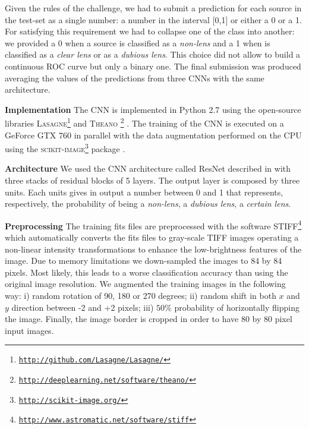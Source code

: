 \documentclass[useAMS,usenatbib]{mnras}
\begin{document}
Given the rules of the challenge, we had to submit a prediction for each source in the test-set as a single number: a number in the interval [0,1] or either a 0 or a 1. For satisfying this requirement we had to collapse one of the class into another: we provided a 0 when a source is classified as a \textit{non-lens} and a 1 when is classified as a \textit{clear lens} or as a \textit{dubious lens}. This choice did not allow to build a continuous ROC curve but only a binary one.
The final submission was produced averaging the values of the predictions from three CNNs with the same architecture.

{\bf Implementation}
The CNN is implemented in Python 2.7 using the open-source libraries \textsc{Lasagne}\footnote{\href{http://github.com/Lasagne/Lasagne/}{\tt http://github.com/Lasagne/Lasagne/}} 
and \textsc{Theano}
\footnote{\href{http://deeplearning.net/software/theano/}{\tt http://deeplearning.net/software/theano/}} \citep{theano}.  
The training of the CNN is executed on a GeForce GTX 760 in parallel with the data augmentation performed on the CPU using the \textsc{scikit-image}\footnote{\href{http://scikit-image.org/}{\tt http://scikit-image.org/}} package \citep{van2014scikit}. 

{\bf Architecture}
We used the CNN architecture called ResNet described in \citep{he2015deep} with three stacks of residual blocks of 5 layers. 
The output layer is composed by three units. Each units gives in output a number between 0 and 1 that represents, respectively, the probability of being a \textit{non-lens}, a \textit{dubious lens}, a \textit{certain lens}.

{\bf Preprocessing}
The training fits files are preprocessed with the software \textsc{STIFF}\footnote{\href{http://www.astromatic.net/software/stiff}{\tt http://www.astromatic.net/software/stiff}} which automatically converts the fits files to gray-scale TIFF images operating a non-linear intensity transformations to enhance the low-brightness features of the image.   
Due to memory limitations we down-sampled the images to 84 by 84 pixels. Most likely, this leads to a worse classification accuracy than using the original image resolution.
We augmented the training images in the following way: i) random rotation of 90, 180 or 270 degrees; ii) random shift in both $x$ and $y$ direction between -2 and +2 pixels; iii) $50\%$ probability of horizontally flipping the image. 
Finally, the image border is cropped in order to have 80 by 80 pixel input images.
\end{document}
